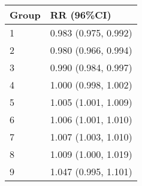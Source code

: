 \begin{tabular}{ll}
  \hline
Group & RR (96\%CI) \\ 
  \hline
   1 & 0.983 (0.975, 0.992) \\ 
     2 & 0.980 (0.966, 0.994) \\ 
     3 & 0.990 (0.984, 0.997) \\ 
     4 & 1.000 (0.998, 1.002) \\ 
     5 & 1.005 (1.001, 1.009) \\ 
     6 & 1.006 (1.001, 1.010) \\ 
     7 & 1.007 (1.003, 1.010) \\ 
     8 & 1.009 (1.000, 1.019) \\ 
     9 & 1.047 (0.995, 1.101) \\ 
   \hline
\end{tabular}

